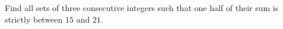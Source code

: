 Find all sets of three consecutive integers such that one half of their sum is strictly between $15$ and $21$.
